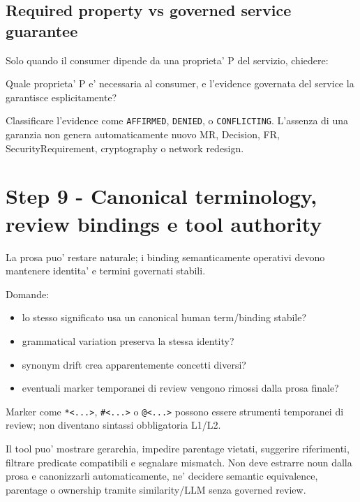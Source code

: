 \documentclass[11pt,a4paper]{article}
\begin{document}
\subsection{Required property vs governed service guarantee}
\workingtag

Solo quando il consumer dipende da una proprieta' P del servizio, chiedere:
\begin{ddtacheck}
Quale proprieta' P e' necessaria al consumer, e l'evidence governata del service la garantisce esplicitamente?
\end{ddtacheck}

Classificare l'evidence come \texttt{AFFIRMED}, \texttt{DENIED}, \NS{} o \texttt{CONFLICTING}. L'assenza di una garanzia non genera automaticamente nuovo MR, Decision, FR, SecurityRequirement, cryptography o network redesign.

\section{Step 9 - Canonical terminology, review bindings e tool authority}
\closedtag

La prosa puo' restare naturale; i binding semanticamente operativi devono mantenere identita' e termini governati stabili.

Domande:
\begin{itemize}
  \item lo stesso significato usa un canonical human term/binding stabile?
  \item grammatical variation preserva la stessa identity?
  \item synonym drift crea apparentemente concetti diversi?
  \item eventuali marker temporanei di review vengono rimossi dalla prosa finale?
\end{itemize}

Marker come \texttt{*<...>}, \texttt{\#<...>} o \texttt{@<...>} possono essere strumenti temporanei di review; non diventano sintassi obbligatoria L1/L2.

\begin{ddtaprinciple}[title={Tool authority boundary}]
Il tool puo' mostrare gerarchia, impedire parentage vietati, suggerire riferimenti, filtrare predicate compatibili e segnalare mismatch. Non deve estrarre noun dalla prosa e canonizzarli automaticamente, ne' decidere semantic equivalence, parentage o ownership tramite similarity/LLM senza governed review.
\end{ddtaprinciple}
\end{document}
